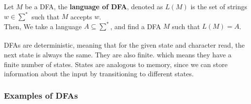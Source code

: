 \documentclass{article}
\begin{document}
    Let $M$ be a DFA, the \textbf{language of DFA}, denoted as $L(M)$ is the set of strings $w \in \sum^*$ such that $M$ accepts $w$.\\
    Then, We take a language $A \subseteq \sum^*$, and find a DFA $M$ such that $L(M) = A$.\\
    \\
    DFAs are deterministic, meaning that for the given state and character read, the next state is always the same. They are also finite. which means they have a finite number of states. States are analogous to memory, since we can store information about the input by transitioning to different states.
    
    \subsubsection{Examples of DFAs}
\end{document}
